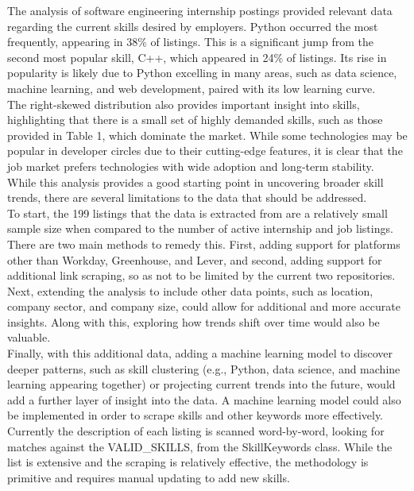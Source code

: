 \documentclass[
	a4paper, %
	10pt, %
	unnumberedsections, %
	twoside, %
]{LTJournalArticle}
\begin{document}
The analysis of software engineering internship postings provided relevant data regarding the current skills desired by employers. Python occurred the most frequently, appearing in 38\% of listings. This is a significant jump from the second most popular skill, C++, which appeared in 24\% of listings. Its rise in popularity is likely due to Python excelling in many areas, such as data science, machine learning, and web development, paired with its low learning curve. \\

The right-skewed distribution also provides important insight into skills, highlighting that there is a small set of highly demanded skills, such as those provided in Table 1, which dominate the market. While some technologies may be popular in developer circles due to their cutting-edge features, it is clear that the job market prefers technologies with wide adoption and long-term stability. \\

While this analysis provides a good starting point in uncovering broader skill trends, there are several limitations to the data that should be addressed. \\

To start, the 199 listings that the data is extracted from are a relatively small sample size when compared to the number of active internship and job listings. There are two main methods to remedy this. First, adding support for platforms other than Workday, Greenhouse, and Lever, and second, adding support for additional link scraping, so as not to be limited by the current two repositories. \\

Next, extending the analysis to include other data points, such as location, company sector, and company size, could allow for additional and more accurate insights. Along with this, exploring how trends shift over time would also be valuable. \\

Finally, with this additional data, adding a machine learning model to discover deeper patterns, such as skill clustering (e.g., Python, data science, and machine learning appearing together) or projecting current trends into the future, would add a further layer of insight into the data. A machine learning model could also be implemented in order to scrape skills and other keywords more effectively. Currently the description of each listing is scanned word-by-word, looking for matches against the VALID\_SKILLS, from the SkillKeywords class. While the list is extensive and the scraping is relatively effective, the methodology is primitive and requires manual updating to add new skills.
\end{document}
